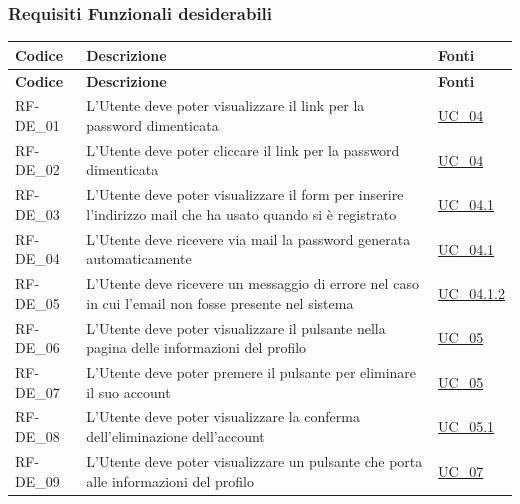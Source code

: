 \subsubsection{Requisiti Funzionali desiderabili}
\renewcommand{\arraystretch}{1.15}
\begin{longtable}{|>{\raggedright}p{}|>{\raggedright\arraybackslash}p{}|>{\raggedright\arraybackslash}p{}|}
	\hline
	\rowcolor[gray]{0.9}
	\textbf{Codice} & \textbf{Descrizione} & \textbf{Fonti} \\
	\hline
	\endfirsthead
	
	\hline
	\rowcolor[gray]{0.9}
	\textbf{Codice} & \textbf{Descrizione} & \textbf{Fonti}  \\
	\hline
	\endhead
	
	\hline
	RF-DE\_01 \hypertarget{rf-de_1} & L'Utente deve poter visualizzare il link per la password dimenticata & \hyperref[uc_04]{UC\_04} \\
	\hline
	RF-DE\_02 \hypertarget{rf-de_2} & L'Utente deve poter cliccare il link per la password dimenticata & \hyperref[uc_04]{UC\_04} \\
	\hline
	RF-DE\_03 \hypertarget{rf-de_3} & L'Utente deve poter visualizzare il form per inserire l'indirizzo mail che ha usato quando si è registrato & \hyperref[uc_04.1]{UC\_04.1} \\
	\hline
	RF-DE\_04 \hypertarget{rf-de_4} & L'Utente deve ricevere via mail la password generata automaticamente & \hyperref[uc_04.1]{UC\_04.1} \\
	\hline
	RF-DE\_05 \hypertarget{rf-de_5} & L'Utente deve ricevere un messaggio di errore nel caso in cui l'email non fosse presente nel sistema & \hyperref[uc_04.1.2]{UC\_04.1.2} \\
	\hline
	RF-DE\_06 \hypertarget{rf-de_6} & L'Utente deve poter visualizzare il pulsante \vr{Elimina Account} nella pagina delle informazioni del profilo & \hyperref[uc_05]{UC\_05} \\
	\hline
	RF-DE\_07 \hypertarget{rf-de_7} & L'Utente deve poter premere il pulsante per eliminare il suo account & \hyperref[uc_05]{UC\_05} \\
	\hline
	RF-DE\_08 \hypertarget{rf-de_8} & L'Utente deve poter visualizzare la conferma dell'eliminazione dell'account & \hyperref[uc_05.1]{UC\_05.1} \\
	\hline
	RF-DE\_09 \hypertarget{rf-de_9} & L'Utente deve poter visualizzare un pulsante che porta alle informazioni del profilo & \hyperref[uc_07]{UC\_07} \\

\end{longtable}
